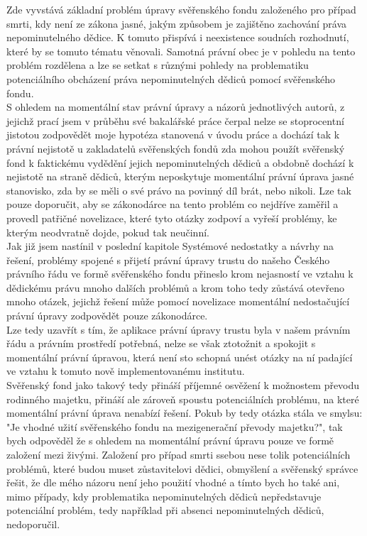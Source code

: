 \documentclass{article}
\begin{document}
Zde vyvstává základní problém úpravy svěřenského fondu založeného pro případ smrti, kdy není ze zákona jasné, jakým způsobem je zajištěno zachování práva nepominutelného dědice. K tomuto přispívá i neexistence soudních rozhodnutí, které by se tomuto tématu věnovali. Samotná právní obec je v pohledu na tento problém rozdělena a lze se setkat s různými pohledy na problematiku potenciálního obcházení práva nepominutelných dědiců pomocí svěřenského fondu.\\

S ohledem na momentální stav právní úpravy a názorů jednotlivých autorů, z jejichž prací jsem v průběhu své bakalářské práce čerpal nelze se stoprocentní jistotou zodpovědět moje hypotéza stanovená v úvodu práce a dochází tak k právní nejistotě u zakladatelů svěřenských fondů zda mohou použít svěřenský fond k faktickému vydědění jejich nepominutelných dědiců a obdobně dochází k nejistotě na straně dědiců, kterým neposkytuje momentální právní úprava jasné stanovisko, zda by se měli o své právo na povinný díl brát, nebo nikoli. Lze tak pouze doporučit, aby se zákonodárce na tento problém co nejdříve zaměřil a provedl patřičné novelizace, které tyto otázky zodpoví a vyřeší problémy, ke kterým neodvratně dojde, pokud tak neučinní.\\

Jak již jsem nastínil v poslední kapitole Systémové nedostatky a návrhy na řešení, problémy spojené s přijetí právní úpravy trustu do našeho Českého právního řádu ve formě svěřenského fondu přineslo krom nejasností ve vztahu k dědickému právu mnoho dalších problémů a krom toho tedy zůstává otevřeno mnoho otázek, jejichž řešení může pomocí novelizace momentální nedostačující právní úpravy zodpovědět pouze zákonodárce.\\

Lze tedy uzavřít s tím, že aplikace právní úpravy trustu byla v našem právním řádu a právním prostředí potřebná, nelze se však ztotožnit a spokojit s momentální právní úpravou, která není sto schopná unést otázky na ní padající ve vztahu k tomuto nově implementovanému institutu.\\

Svěřenský fond jako takový tedy přináší příjemné osvěžení k možnostem převodu rodinného majetku, přináší ale zároveň spoustu potenciálních problému, na které momentální právní úprava nenabízí řešení. Pokub by tedy otázka stála ve smylsu: "Je vhodné užití svěřenského fondu na mezigenerační převody majetku?", tak bych odpověděl že s ohledem na momentální právní úpravu pouze ve formě založení mezi živými. Založení pro případ smrti ssebou nese tolik potenciálních problémů, které budou muset zůstavitelovi dědici, obmyšlení a svěřenský správce řešit, že dle mého názoru není jeho použití vhodné a tímto bych ho také ani, mimo případy, kdy problematika nepominutelných dědiců nepředstavuje potenciální problém, tedy například při absenci nepominutelných dědiců, nedoporučil.\\
\end{document}

